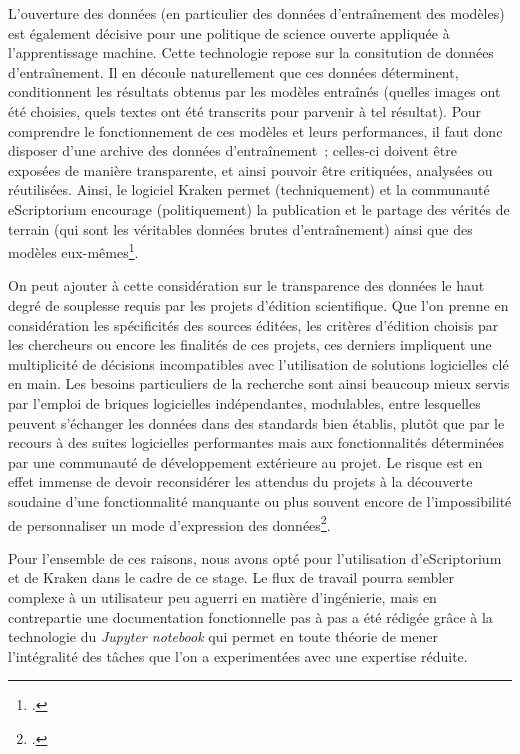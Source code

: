 \documentclass[a4paper,12pt,twoside]{book}
\begin{document}
				L'ouverture des données (en particulier des données d'entraînement des modèles) est également décisive pour une politique de science ouverte appliquée à l'apprentissage machine. Cette technologie repose sur la consitution de données d'entraînement. Il en découle naturellement que ces données déterminent, conditionnent les résultats obtenus par les modèles entraînés (quelles images ont été choisies, quels textes ont été transcrits pour parvenir à tel résultat). Pour comprendre le fonctionnement de ces modèles et leurs performances, il faut donc disposer d'une archive des données d'entraînement~; celles-ci doivent être exposées de manière transparente, et ainsi pouvoir être critiquées, analysées ou réutilisées. Ainsi, le logiciel Kraken permet (techniquement) et la communauté eScriptorium encourage (politiquement) la publication et le partage des vérités de terrain (qui sont les véritables données brutes d'entraînement) ainsi que des modèles eux-mêmes\footcite{chagueHTRUnitedMutualisonsVerite2021}.
				
				On peut ajouter à cette considération sur le transparence des données le haut degré de souplesse requis par les projets d'édition scientifique. Que l'on prenne en considération les spécificités des sources éditées, les critères d'édition choisis par les chercheurs ou encore les finalités de ces projets, ces derniers impliquent une multiplicité de décisions incompatibles avec l'utilisation de solutions logicielles clé en main. Les besoins particuliers de la recherche sont ainsi beaucoup mieux servis par l'emploi de briques logicielles indépendantes, modulables, entre lesquelles peuvent s'échanger les données dans des standards bien établis, plutôt que par le recours à des suites logicielles performantes mais aux fonctionnalités déterminées par une communauté de développement extérieure au projet. Le risque est en effet immense de devoir reconsidérer les attendus du projets à la découverte soudaine d'une fonctionnalité manquante ou plus souvent encore de l'impossibilité de personnaliser un mode d'expression des données\footcite{stokesEScriptoriumVREManuscript2021}.
				
				Pour l'ensemble de ces raisons, nous avons opté pour l'utilisation d'eScriptorium et de Kraken dans le cadre de ce stage. Le flux de travail pourra sembler complexe à un utilisateur peu aguerri en matière d'ingénierie, mais en contrepartie une documentation fonctionnelle pas à pas a été rédigée grâce à la technologie du \textit{Jupyter notebook} qui permet en toute théorie de mener l'intégralité des tâches que l'on a experimentées avec une expertise réduite.
							
\end{document}
